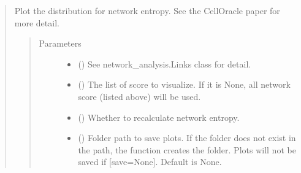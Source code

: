 \documentclass[letterpaper,10pt,english]{sphinxmanual}
\begin{document}
\begin{quote}
\begin{fulllineitems}
\begin{fulllineitems}
\label{\detokenize{modules/celloracle.network_analysis:celloracle.network_analysis.Links.plot_network_entropy_distributions}}
Plot the distribution for network entropy.
See the CellOracle paper for more detail.
\begin{quote}\begin{description}
\item[{Parameters}] \leavevmode\begin{itemize}
\item {} 
 () \textendash{} See network\_analysis.Links class for detail.

\item {} 
 () \textendash{} The list of score to visualize. If it is None, all network score (listed above) will be used.

\item {} 
 () \textendash{} Whether to recalculate network entropy.

\item {} 
 () \textendash{} Folder path to save plots. If the folder does not exist in the path, the function creates the folder.
Plots will not be saved if {[}save=None{]}. Default is None.

\end{itemize}

\end{description}\end{quote}

\end{fulllineitems}



\end{fulllineitems}
\end{quote}
\end{document}
